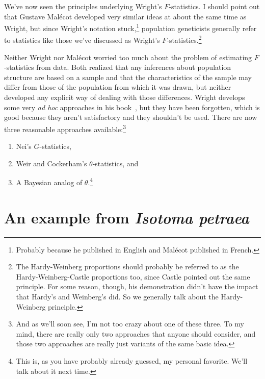We've now seen the principles underlying Wright's $F$-statistics. I
should point out that Gustave Mal{\'e}cot developed very similar ideas
at about the same time as Wright, but since Wright's notation
stuck,\footnote{Probably because he published in English and
  Mal{\'e}cot published in French.} population geneticists generally
refer to statistics like those we've discussed as Wright's
$F$-statistics.\footnote{The Hardy-Weinberg proportions should
  probably be referred to as the Hardy-Weinberg-Castle proportions
  too, since Castle pointed out the same principle. For some reason,
  though, his demonstration didn't have the impact that Hardy's and
  Weinberg's did. So we generally talk about the Hardy-Weinberg
  principle.}

Neither Wright nor Mal{\'e}cot worried too much about the problem of
estimating $F$-statistics from data. Both realized that any inferences
about population structure are based on a sample and that the
characteristics of the sample may differ from those of the population
from which it was drawn, but neither developed any explicit way of
dealing with those differences. Wright develops some very {\it ad
  hoc\/} approaches in his book~\cite{Wright69}, but they have been
forgotten, which is good because they aren't satisfactory and they
shouldn't be used. There are now three reasonable approaches
available:\footnote{And as we'll
  soon see, I'm not too crazy about one of these three. To my mind,
  there are really only two approaches that anyone should consider,
  and those two approaches are really just variants of the same basic
  idea.}

\begin{enumerate}

\item Nei's $G$-statistics,

\item Weir and Cockerham's $\theta$-statistics, and

\item A Bayesian analog of $\theta$.\footnote{This is, as you have
  probably already guessed, my personal favorite. We'll talk about
  it next time.}

\end{enumerate}

\section*{An example from {\it Isotoma petraea}}

